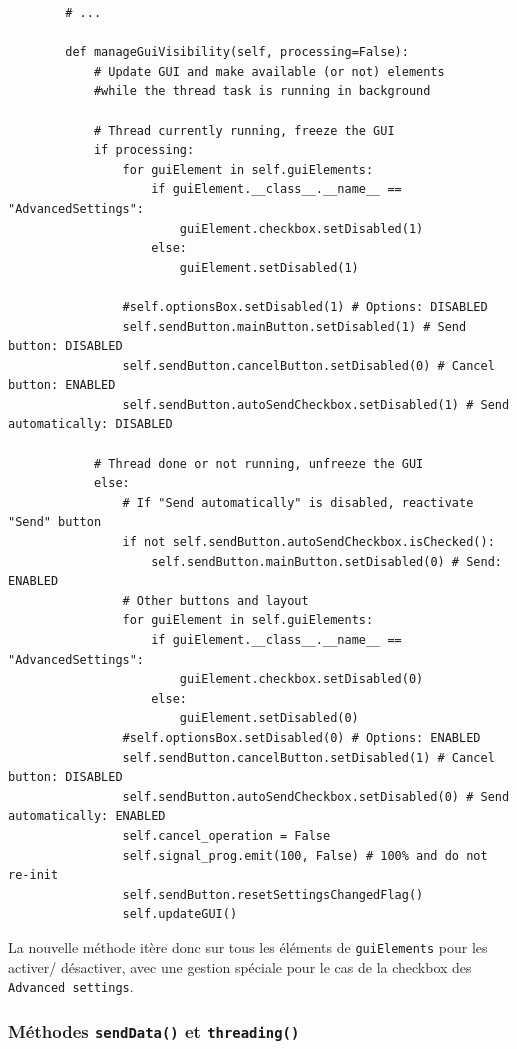 \documentclass{article}
\begin{document}
{\begin{verbatim}
        # ...

        def manageGuiVisibility(self, processing=False):
            # Update GUI and make available (or not) elements
            #while the thread task is running in background
    
            # Thread currently running, freeze the GUI
            if processing:
                for guiElement in self.guiElements:
                    if guiElement.__class__.__name__ == "AdvancedSettings":
                        guiElement.checkbox.setDisabled(1)
                    else:
                        guiElement.setDisabled(1)
    
                #self.optionsBox.setDisabled(1) # Options: DISABLED
                self.sendButton.mainButton.setDisabled(1) # Send button: DISABLED
                self.sendButton.cancelButton.setDisabled(0) # Cancel button: ENABLED
                self.sendButton.autoSendCheckbox.setDisabled(1) # Send automatically: DISABLED
    
            # Thread done or not running, unfreeze the GUI
            else:
                # If "Send automatically" is disabled, reactivate "Send" button
                if not self.sendButton.autoSendCheckbox.isChecked():
                    self.sendButton.mainButton.setDisabled(0) # Send: ENABLED
                # Other buttons and layout
                for guiElement in self.guiElements:
                    if guiElement.__class__.__name__ == "AdvancedSettings":
                        guiElement.checkbox.setDisabled(0)
                    else:
                        guiElement.setDisabled(0)
                #self.optionsBox.setDisabled(0) # Options: ENABLED
                self.sendButton.cancelButton.setDisabled(1) # Cancel button: DISABLED
                self.sendButton.autoSendCheckbox.setDisabled(0) # Send automatically: ENABLED
                self.cancel_operation = False
                self.signal_prog.emit(100, False) # 100% and do not re-init
                self.sendButton.resetSettingsChangedFlag()
                self.updateGUI()
\end{verbatim}

La nouvelle méthode itère donc sur tous les éléments de \texttt{guiElements} pour les activer/ désactiver, avec une gestion spéciale pour le cas de la checkbox des \texttt{Advanced settings}.

\subsubsection{Méthodes \texttt{sendData()} et \texttt{threading()}}

}
\end{document}
